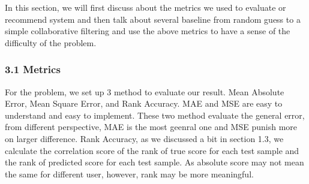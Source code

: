 \documentclass[11pt]{article}
\begin{document}
    In this section, we will first discuss about the metrics we used to
evaluate or recommend system and then talk about several baseline from
random guess to a simple collaborative filtering and use the above
metrics to have a sense of the difficulty of the problem.

    \hypertarget{metrics}{%
\subsubsection{3.1 Metrics}\label{metrics}}

For the problem, we set up 3 method to evaluate our result. Mean
Absolute Error, Mean Square Error, and Rank Accuracy. MAE and MSE are
easy to understand and easy to implement. These two method evaluate the
general error, from different perspective, MAE is the most geenral one
and MSE punish more on larger difference. Rank Accuracy, as we discussed
a bit in section 1.3, we calculate the correlation score of the rank of
true score for each test sample and the rank of predicted score for each
test sample. As absolute score may not mean the same for different user,
however, rank may be more meaningful.
\end{document}
